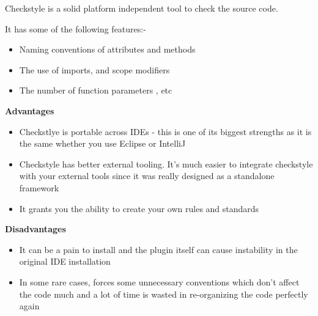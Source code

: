 \documentclass[12pt,letterpaper]{article}
\begin{document}
Checkstyle is a solid platform independent tool to check the source code.

It has some of the following features:-
\begin{itemize}
\item{Naming conventions of attributes and methods}
\item{The use of imports, and scope modifiers}
\item{The number of function parameters , etc}
\end{itemize}

\textbf{Advantages}

\begin{itemize}
\item{Checkstlye is portable across IDEs - this is one of its biggest strengths as it is the same whether you use Eclipse or IntelliJ}
\item{Checkstyle has better external tooling. It's much easier to integrate checkstyle with your external tools since it was really designed as a standalone framework}
\item{It grants you the ability to create your own rules and standards }
\end{itemize}

\textbf{Disadvantages}

\begin{itemize}
\item{It can be a pain to install and the plugin itself can cause instability in the original IDE installation}
\item{In some rare cases, forces some unnecessary conventions which don't affect the code much and a lot of time is wasted in re-organizing the code perfectly again}
\end{itemize}
\end{document}
